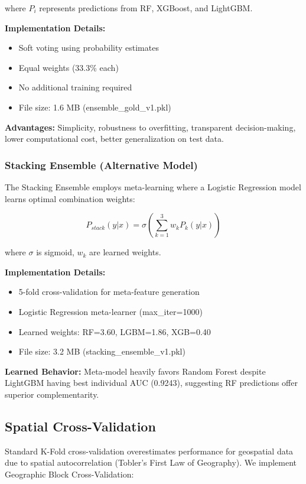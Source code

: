 \documentclass[12pt,a4paper]{article}
\begin{document}
where $P_i$ represents predictions from RF, XGBoost, and LightGBM.

\textbf{Implementation Details:}
\begin{itemize}
    \item Soft voting using probability estimates
    \item Equal weights (33.3\% each)
    \item No additional training required
    \item File size: 1.6 MB (ensemble\_gold\_v1.pkl)
\end{itemize}

\textbf{Advantages:} Simplicity, robustness to overfitting, transparent decision-making, lower computational cost, better generalization on test data.

\subsubsection{Stacking Ensemble (Alternative Model)}

The Stacking Ensemble employs meta-learning where a Logistic Regression model learns optimal combination weights:

\begin{equation}
P_{stack}(y|x) = \sigma\left(\sum_{k=1}^{3} w_k P_k(y|x)\right)
\end{equation}

where $\sigma$ is sigmoid, $w_k$ are learned weights.

\textbf{Implementation Details:}
\begin{itemize}
    \item 5-fold cross-validation for meta-feature generation
    \item Logistic Regression meta-learner (max\_iter=1000)
    \item Learned weights: RF=3.60, LGBM=1.86, XGB=0.40
    \item File size: 3.2 MB (stacking\_ensemble\_v1.pkl)
\end{itemize}

\textbf{Learned Behavior:} Meta-model heavily favors Random Forest despite LightGBM having best individual AUC (0.9243), suggesting RF predictions offer superior complementarity.

\subsection{Spatial Cross-Validation}

Standard K-Fold cross-validation overestimates performance for geospatial data due to spatial autocorrelation (Tobler's First Law of Geography). We implement Geographic Block Cross-Validation:
\end{document}
